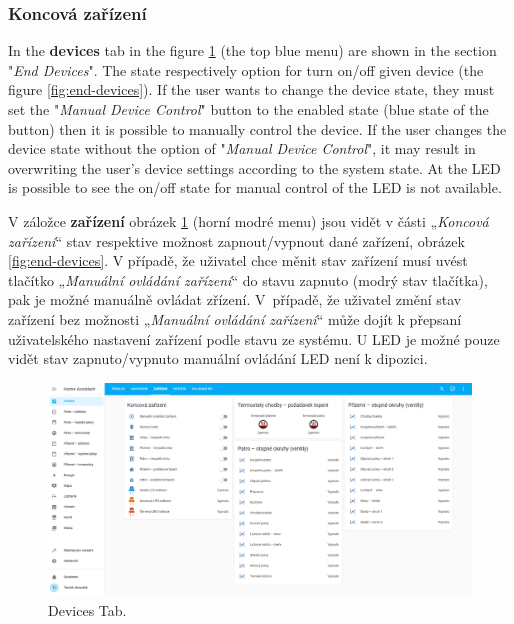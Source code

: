 \begin{Czech}
\subsubsection{Koncová zařízení}
\end{Czech}


\begin{English}
In the \textbf{devices} tab in the figure \ref{fig:tab-devices} (the top blue menu) are shown in the section "\textit{End Devices}". The state respectively option for turn on/off given device (the figure \ref{fig:end-devices}). If the user wants to change the device state, they must set the "\textit{Manual Device Control}" button to the enabled state (blue state of the button) then it is possible to manually control the device. If the user changes the device state without the option of  "\textit{Manual Device Control}", it may result in overwriting the user's device settings according to the system state. At the LED is possible to see the on/off state for manual control of the LED is not available. 
\end{English}

\begin{Czech}
V záložce \textbf{zařízení} obrázek \ref{fig:tab-devices} (horní modré menu) jsou vidět v části „\textit{Koncová zařízení}“ stav respektive možnost zapnout/vypnout dané zařízení, obrázek \ref{fig:end-devices}. V případě, že uživatel chce měnit stav zařízení musí uvést tlačítko „\textit{Manuální ovládání zařízení}“ do stavu zapnuto (modrý stav tlačítka), pak je možné manuálně ovládat zřízení. \mbox{V případě}, že uživatel změní stav zařízení bez možnosti „\textit{Manuální ovládání zařízení}“ může dojít k přepsaní uživatelského nastavení zařízení podle stavu ze systému. U LED je možné pouze vidět stav zapnuto/vypnuto manuální ovládání LED není k dipozici.
\end{Czech}


\begin{English}
\begin{figure}[H]
    \centering
    \includegraphics[width=1\textwidth]{pictures/czech/software/devices-tab.png}
    \caption{Devices Tab.}
    \label{fig:tab-devices}
\end{figure}
\end{English}

